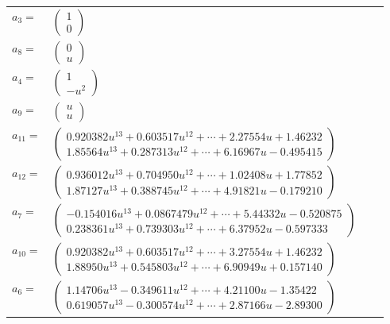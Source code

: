 \documentclass[1p]{elsarticle_modified}
\theoremstyle{definition}
\begin{document}
\begin{tabular}{m{7pt} m{180pt} m{7pt} m{180pt} }
\flushright $a_{3}=$&$\begin{pmatrix}1\\0\end{pmatrix}$ \\
\flushright $a_{8}=$&$\begin{pmatrix}0\\u\end{pmatrix}$ \\
\flushright $a_{4}=$&$\begin{pmatrix}1\\- u^2\end{pmatrix}$ \\
\flushright $a_{9}=$&$\begin{pmatrix}u\\u\end{pmatrix}$ \\
\flushright $a_{11}=$&$\begin{pmatrix}0.920382 u^{13}+0.603517 u^{12}+\cdots+2.27554 u+1.46232\\1.85564 u^{13}+0.287313 u^{12}+\cdots+6.16967 u-0.495415\end{pmatrix}$ \\
\flushright $a_{12}=$&$\begin{pmatrix}0.936012 u^{13}+0.704950 u^{12}+\cdots+1.02408 u+1.77852\\1.87127 u^{13}+0.388745 u^{12}+\cdots+4.91821 u-0.179210\end{pmatrix}$ \\
\flushright $a_{7}=$&$\begin{pmatrix}-0.154016 u^{13}+0.0867479 u^{12}+\cdots+5.44332 u-0.520875\\0.238361 u^{13}+0.739303 u^{12}+\cdots+6.37952 u-0.597333\end{pmatrix}$ \\
\flushright $a_{10}=$&$\begin{pmatrix}0.920382 u^{13}+0.603517 u^{12}+\cdots+3.27554 u+1.46232\\1.88950 u^{13}+0.545803 u^{12}+\cdots+6.90949 u+0.157140\end{pmatrix}$ \\
\flushright $a_{6}=$&$\begin{pmatrix}1.14706 u^{13}-0.349611 u^{12}+\cdots+4.21100 u-1.35422\\0.619057 u^{13}-0.300574 u^{12}+\cdots+2.87166 u-2.89300\end{pmatrix}$ \\

\end{tabular}
\end{document}
